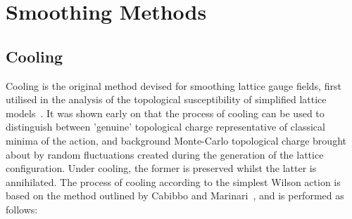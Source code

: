 \section{Smoothing Methods}
\subsection{Cooling}
Cooling is the original method devised for smoothing lattice gauge fields, first utilised in the analysis of the topological susceptibility of simplified lattice models~\cite{Berg:1981nw}. It was shown early on that the process of cooling can be used to distinguish between 'genuine' topological charge representative of classical minima of the action, and background Monte-Carlo topological charge brought about by random fluctuations created during the generation of the lattice configuration. Under cooling, the former is preserved whilst the latter is annihilated. The process of cooling according to the simplest Wilson action is based on the method outlined by Cabibbo and Marinari~\cite{Cabibbo:1982zn,Creutz:1980zw}, and is performed as follows:\\

